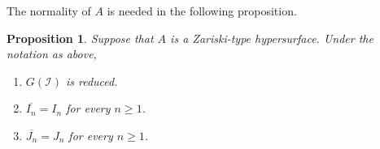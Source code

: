 \documentclass[12pt]{amsart}
\newtheorem{prop}[thm]{Proposition}
\theoremstyle{definition}
\theoremstyle{remark}
\numberwithin{equation}{section}
\begin{document}
\par \vspace{2mm}
The normality of $A$ is needed in the following proposition. 

\begin{prop} \label{IntClos}
Suppose that $A$ is a Zariski-type hypersurface. 
Under the notation as above, 
\begin{enumerate}
\item[\rm{(a)}] $G(\mathcal{I})$ is reduced. 
\item[\rm{(b)}] $\overline{I_{n}}=I_{n}$ for every $n \ge 1$. 
\item[\rm{(c)}] $\overline{J_{n}}=J_{n}$ for every $n \ge 1$. 
\end{enumerate}
\end{prop}
\end{document}
